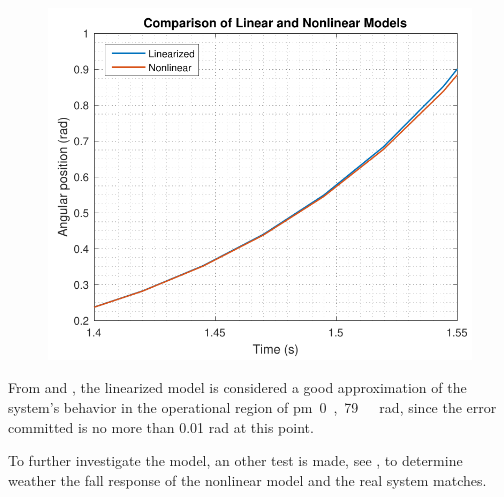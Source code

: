 \hspace{0.002\linewidth}
\begin{minipage}{0.45\linewidth}
	\begin{figure}[H]
		\includegraphics[scale=.45]{figures/LinearizedVSNonlinearZoom}
		\centering
		\vspace{-.1cm}
		\captionsetup{justification=centering}
		\label{LinearizedVSNonlinearZoom}
	\end{figure}\vspace{-4mm}
\end{minipage}

From  and , the linearized model is considered a good approximation of the system's behavior in the operational region of \si{\pm 0,79\ rad}, since the error committed is no more than 0.01 rad at this point.

To further investigate the model, an other test is made, see , to determine weather the fall response of the nonlinear model and the real system matches.

